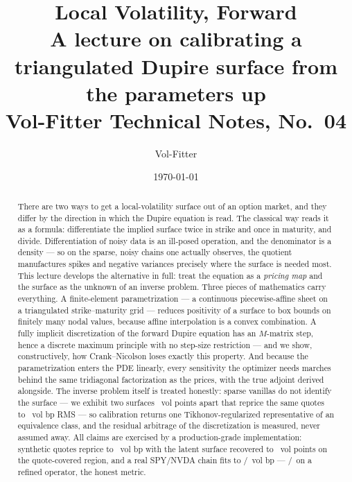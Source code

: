 \documentclass[11pt]{article}
\title{\textbf{Local Volatility, Forward}\\[2pt]
\large A lecture on calibrating a triangulated Dupire surface from the
parameters up\\[2pt]
\normalsize Vol-Fitter Technical Notes, No.~04}
\author{Vol-Fitter}
\date{\today}
\begin{document}
\maketitle




\begin{abstract}
There are two ways to get a local-volatility surface out of an option
market, and they differ by the direction in which the Dupire equation is
read.  The classical way reads it as a formula: differentiate the implied
surface twice in strike and once in maturity, and divide.  Differentiation
of noisy data is an ill-posed operation, and the denominator is a density
--- so on the sparse, noisy chains one actually observes, the quotient
manufactures spikes and negative variances precisely where the surface is
needed most.  This lecture develops the alternative in full: treat the
equation as a \emph{pricing map} and the surface as the unknown of an
inverse problem.  Three pieces of mathematics carry everything.  A
finite-element parametrization --- a continuous piecewise-affine sheet on a
triangulated strike--maturity grid --- reduces positivity of a surface to
box bounds on finitely many nodal values, because affine interpolation is a
convex combination.  A fully implicit discretization of the forward Dupire
equation has an $M$-matrix step, hence a discrete maximum principle with no
step-size restriction --- and we show, constructively, how Crank--Nicolson
loses exactly this property.  And because the parametrization enters the
PDE linearly, every sensitivity the optimizer needs marches behind the same
tridiagonal factorization as the prices, with the true adjoint derived
alongside.  The inverse problem itself is treated honestly: sparse vanillas
do not identify the surface --- we exhibit two surfaces
\lvfidentvolmove\ vol points apart that reprice the same quotes to
\lvfidentrmsalt\ vol bp RMS --- so calibration returns one
Tikhonov-regularized representative of an equivalence class, and the
residual arbitrage of the discretization is measured, never assumed away.
All claims are exercised by a production-grade implementation: synthetic
quotes reprice to \lvfrtmaxerr\ vol bp with the latent surface recovered to
\lvfrtsurfmax\ vol points on the quote-covered region, and a real SPY/NVDA
chain fits to \lvspyrms/\lvnvdarms\ vol bp --- \lvspyconv/\lvnvdaconv\ on a
refined operator, the honest metric.
\end{abstract}
\end{document}
